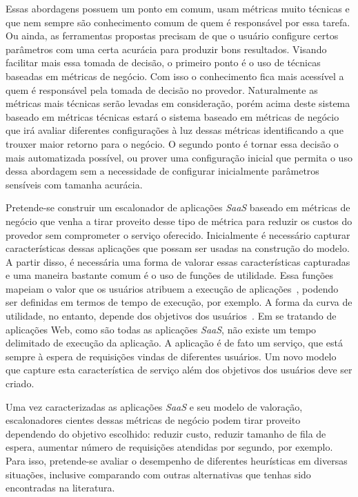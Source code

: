 \documentclass[a4paper,titlepage,12pt]{article}
\begin{document}
Essas abordagens possuem um ponto em comum, usam métricas muito técnicas e que nem sempre são conhecimento comum de quem é responsável por essa tarefa. Ou ainda, as ferramentas propostas precisam de que o usuário configure certos parâmetros com uma certa acurácia para produzir bons resultados. Visando facilitar mais essa tomada de decisão, o primeiro ponto é o uso de técnicas baseadas em métricas de negócio. Com isso o conhecimento fica mais acessível a quem é responsável pela tomada de decisão no provedor. Naturalmente as métricas mais técnicas serão levadas em consideração, porém acima deste sistema baseado em métricas técnicas estará o sistema baseado em métricas de negócio que irá avaliar diferentes configurações à luz dessas métricas identificando a que trouxer maior retorno para o negócio. O segundo ponto é tornar essa decisão o mais automatizada possível, ou prover uma configuração inicial que permita o uso dessa abordagem sem a necessidade de configurar inicialmente parâmetros sensíveis com tamanha acurácia. 

Pretende-se construir um escalonador de aplicações \textit{SaaS} baseado em métricas de negócio que venha a tirar proveito desse tipo de métrica para reduzir os custos do provedor sem comprometer o serviço oferecido. Inicialmente é necessário capturar características dessas aplicações que possam ser usadas na construção do modelo. A partir disso, é necessária uma forma de valorar essas características capturadas e uma maneira bastante comum é o uso de funções de utilidade. Essa funções mapeiam o valor que os usuários atribuem a execução de aplicações~\cite{wilkes-utility}, podendo ser definidas em termos de tempo de execução, por exemplo. A forma da curva de utilidade, no entanto, depende dos objetivos dos usuários~\cite{lee-utility}. Em se tratando de aplicações Web, como são todas as aplicações \textit{SaaS}, não existe um tempo delimitado de execução da aplicação. A aplicação é de fato um serviço, que está sempre à espera de requisições vindas de diferentes usuários. Um novo modelo que capture esta característica de serviço além dos objetivos dos usuários deve ser criado.

Uma vez caracterizadas as aplicações \textit{SaaS} e seu modelo de valoração, escalonadores cientes dessas métricas de negócio podem tirar proveito dependendo do objetivo escolhido: reduzir custo, reduzir tamanho de fila de espera, aumentar número de requisições atendidas por segundo, por exemplo. Para isso, pretende-se avaliar o desempenho de diferentes heurísticas em diversas situações, inclusive comparando com outras alternativas que tenhas sido encontradas na literatura. 
\end{document}
